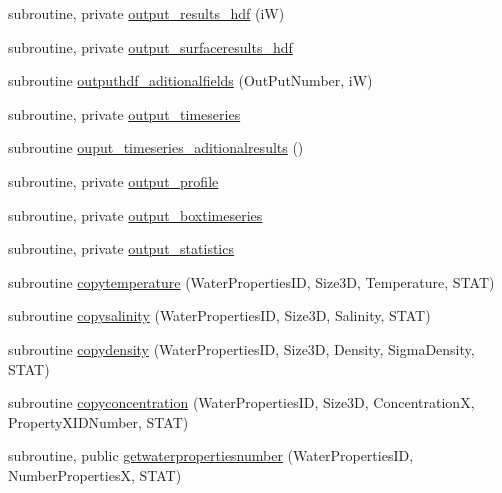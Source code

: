 \begin{DoxyCompactItemize}
\item 
subroutine, private \mbox{\hyperlink{namespacemodulewaterproperties_aa0e5621dbf495abbff865260517a210e}{output\+\_\+results\+\_\+hdf}} (iW)
\item 
subroutine, private \mbox{\hyperlink{namespacemodulewaterproperties_a3c8948249582551960c897355058c5f0}{output\+\_\+surfaceresults\+\_\+hdf}}
\item 
subroutine \mbox{\hyperlink{namespacemodulewaterproperties_a0e590dc368b505cd9ea918d724d3eee3}{outputhdf\+\_\+aditionalfields}} (Out\+Put\+Number, iW)
\item 
subroutine, private \mbox{\hyperlink{namespacemodulewaterproperties_a0725e3aa303d243b60469b2ad581deaa}{output\+\_\+timeseries}}
\item 
subroutine \mbox{\hyperlink{namespacemodulewaterproperties_a98520e5c44c187e7d09c51cc9864bb63}{ouput\+\_\+timeseries\+\_\+aditionalresults}} ()
\item 
subroutine, private \mbox{\hyperlink{namespacemodulewaterproperties_adbe4280f2ebe3767932360d61563ff93}{output\+\_\+profile}}
\item 
subroutine, private \mbox{\hyperlink{namespacemodulewaterproperties_a8400d7aab12081d64e14b5947eb9734c}{output\+\_\+boxtimeseries}}
\item 
subroutine, private \mbox{\hyperlink{namespacemodulewaterproperties_ae4782724563831422008fbeb12c51841}{output\+\_\+statistics}}
\item 
subroutine \mbox{\hyperlink{namespacemodulewaterproperties_a6c8ccf3bc2c3f4cc47ee4ebfd2a2b354}{copytemperature}} (Water\+Properties\+ID, Size3D, Temperature, S\+T\+AT)
\item 
subroutine \mbox{\hyperlink{namespacemodulewaterproperties_afb6f9f66ff7f1eabafe85dfdf9ddeca8}{copysalinity}} (Water\+Properties\+ID, Size3D, Salinity, S\+T\+AT)
\item 
subroutine \mbox{\hyperlink{namespacemodulewaterproperties_a71b237b2c78cd159d5fc9be5a1a5f127}{copydensity}} (Water\+Properties\+ID, Size3D, Density, Sigma\+Density, S\+T\+AT)
\item 
subroutine \mbox{\hyperlink{namespacemodulewaterproperties_ab01a5978241b2f90c9951fe60f6f7f8a}{copyconcentration}} (Water\+Properties\+ID, Size3D, ConcentrationX, Property\+X\+I\+D\+Number, S\+T\+AT)
\item 
subroutine, public \mbox{\hyperlink{namespacemodulewaterproperties_a6e98b7d8e639a6feac4f88974d90c5e5}{getwaterpropertiesnumber}} (Water\+Properties\+ID, Number\+PropertiesX, S\+T\+AT)
\item 

\end{DoxyCompactItemize}
